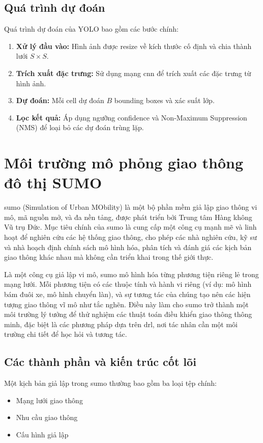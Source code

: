 \subsection{Quá trình dự đoán}
Quá trình dự đoán của YOLO bao gồm các bước chính:
\begin{enumerate}
    \item \textbf{Xử lý đầu vào:} Hình ảnh được resize về kích thước cố định và
        chia thành lưới $S \times S$.

    \item \textbf{Trích xuất đặc trưng:} Sử dụng mạng \ac{cnn} để trích xuất các
        đặc trưng từ hình ảnh.

    \item \textbf{Dự đoán:} Mỗi cell dự đoán $B$ bounding boxes và xác suất lớp.

    \item \textbf{Lọc kết quả:} Áp dụng ngưỡng confidence và Non-Maximum
        Suppression (NMS) để loại bỏ các dự đoán trùng lặp.
\end{enumerate}

\section{Môi trường mô phỏng giao thông đô thị SUMO}
\ac{sumo} (Simulation of Urban MObility) là một bộ phần mềm giả lập giao thông vi
mô, mã nguồn mở, và đa nền tảng, được phát triển bởi Trung tâm Hàng không Vũ trụ
Đức. Mục tiêu chính của \ac{sumo} là cung cấp một công cụ mạnh mẽ và linh hoạt
để nghiên cứu các hệ thống giao thông, cho phép các nhà nghiên cứu, kỹ sư và nhà
hoạch định chính sách mô hình hóa, phân tích và đánh giá các kịch bản giao thông
khác nhau mà không cần triển khai trong thế giới thực.

Là một công cụ giả lập vi mô, \ac{sumo} mô hình hóa từng phương tiện riêng lẻ trong
mạng lưới. Mỗi phương tiện có các thuộc tính và hành vi riêng (ví dụ: mô hình
bám đuôi xe, mô hình chuyển làn), và sự tương tác của chúng tạo nên các hiện tượng
giao thông vĩ mô như tắc nghẽn. Điều này làm cho \ac{sumo} trở thành một môi trường
lý tưởng để thử nghiệm các thuật toán điều khiển giao thông thông minh, đặc biệt
là các phương pháp dựa trên \ac{drl}, nơi tác nhân cần một môi trường chi tiết
để học hỏi và tương tác.

\subsection{Các thành phần và kiến trúc cốt lõi}
Một kịch bản giả lập trong \ac{sumo} thường bao gồm ba loại tệp chính:
\begin{itemize}
    \item Mạng lưới giao thông

    \item Nhu cầu giao thông

    \item Cấu hình giả lập
\end{itemize}

